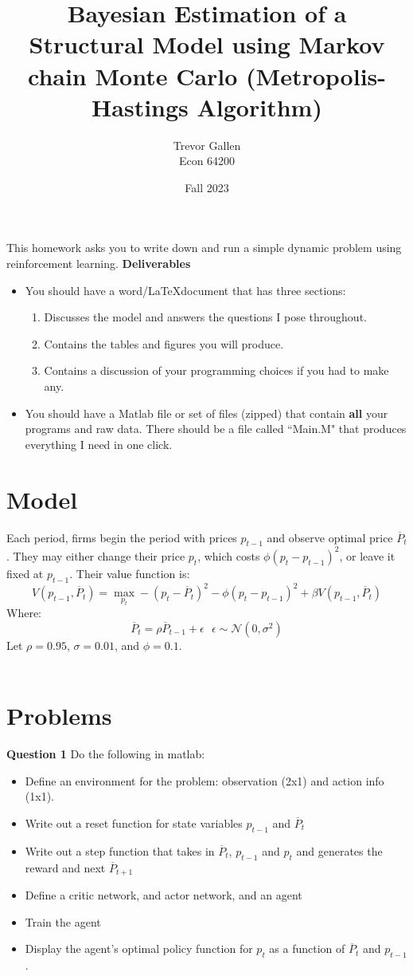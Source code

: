 \documentclass[11pt]{article}
\title{Bayesian Estimation of a Structural Model using Markov chain Monte Carlo (Metropolis-Hastings Algorithm)  }
\author{ Trevor Gallen \\ Econ 64200 }
\date{Fall 2023}
\begin{document}


\maketitle

This homework asks you to write down and run a simple dynamic problem using reinforcement learning.
\textbf{Deliverables}
\begin{itemize}
\item You should have a word/\LaTeX document that has three sections: 
\begin{enumerate}
\item Discusses the model and answers the questions I pose throughout.
\item Contains the tables and figures you will produce.
\item Contains a discussion of your programming choices if you had to make any.
\end{enumerate}
\item You should have a Matlab file or set of files (zipped) that contain \textbf{all} your programs and raw data.  There should be a file called ``Main.M" that produces everything I need in one click.
\end{itemize}


\section{Model}
Each period, firms begin the period with prices $p_{t-1}$ and observe optimal price $\overline{P}_t$.  They may either change their price $p_t$, which costs $\phi(p_{t}-p_{t-1})^2$, or leave it fixed at $p_{t-1}$.  Their value function is:
$$V(p_{t-1},\overline{P}_t)=\underset{p_t}{\max} -(p_t-\overline{P}_t)^2-\phi(p_{t}-p_{t-1})^2+\beta V(p_{t-1},\overline{P}_t)$$
Where:
$$\overline{P}_t=\rho \overline{P}_{t-1}+\epsilon\ \ \ \epsilon\sim\mathcal{N}\left(0,\sigma^2\right)$$
Let $\rho=0.95$, $\sigma=0.01$, and $\phi=0.1$.  
\ \\
\ \\

\section{Problems}
\textbf{Question 1} Do the following in matlab:
\begin{itemize}
\item Define an environment for the problem: observation (2x1) and action info (1x1).
\item Write out a reset function for state variables $p_{t-1}$ and $\overline{P}_t$
\item Write out a step function that takes in $\overline{P}_t$, $p_{t-1}$ and $p_{t}$ and generates the reward and next  $\overline{P}_{t+1}$
\item Define a critic network, and actor network, and an agent
\item Train the agent
\item Display the agent's optimal policy function for $p_t$ as a function of $\overline{P}_t$ and $p_{t-1}$.
\end{itemize}
 
\end{document}
